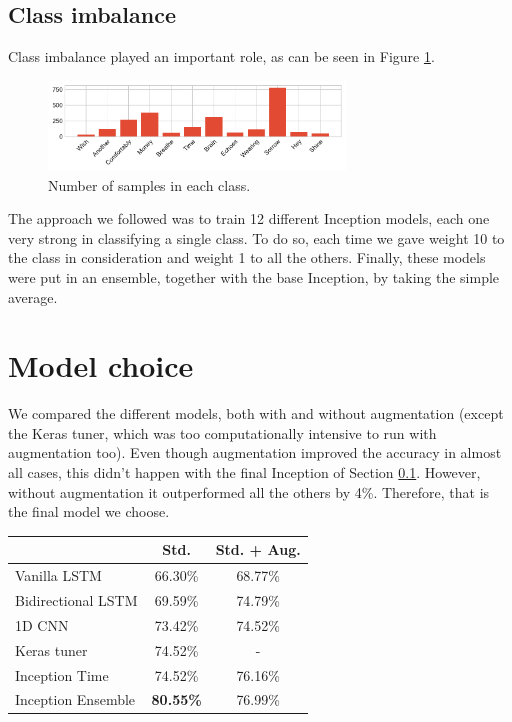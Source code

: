 \documentclass[conference,compsoc,11pt]{IEEEtran}
\begin{document}
\subsection{Class imbalance}\label{sec:cl_imb}

Class imbalance played an important role, as can be seen in Figure \ref{fig:imbalance}.

\begin{figure}[h!]
\centering
\includegraphics[width=3.1in]{class_imbalance.pdf}
\caption{Number of samples in each class.}
\label{fig:imbalance}
\end{figure}

The approach we followed was to train 12 different Inception models, each one very strong in classifying a single class. To do so, each time we gave weight 10 to the class in consideration and weight 1 to all the others. Finally, these models were put in an ensemble, together with the base Inception, by taking the simple average.

\section{Model choice}\label{sec:model-choice}

We compared the different models, both with and without augmentation (except the Keras tuner, which was too computationally intensive to run with augmentation too). Even though augmentation improved the accuracy in almost all cases, this didn't happen with the final Inception of Section \ref{sec:cl_imb}. However, without augmentation it outperformed all the others by 4\%. Therefore, that is the final model we choose.

\begin{center}
\begin{tabular}{ l c c }
\hline\hline
 & Std. & Std. + Aug.\\
\hline
Vanilla LSTM       & 66.30\% & 68.77\% \\
Bidirectional LSTM & 69.59\% & 74.79\% \\
1D CNN             & 73.42\% & 74.52\% \\
Keras tuner        & 74.52\% & - \\
Inception Time     & 74.52\% & 76.16\% \\
Inception Ensemble & \textbf{80.55\%} & 76.99\% \\
\hline\hline
\end{tabular}
\end{center}
\end{document}
